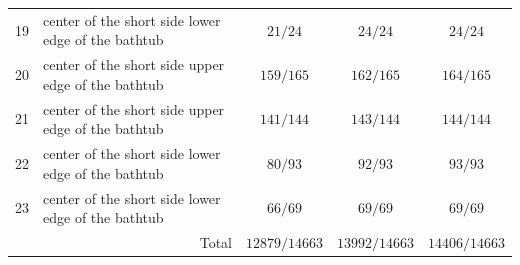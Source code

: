 \begin{table}[h]
\begin{tabular}{cl ccc}
19 & center of the short side lower edge of the bathtub & $21/24$ & $24/24$ & $24/24$ \\
20 & center of the short side upper edge of the bathtub & $159/165$ & $162/165$ & $164/165$ \\
21 & center of the short side upper edge of the bathtub & $141/144$ & $143/144$ & $144/144$ \\
22 & center of the short side lower edge of the bathtub & $80/93$ & $92/93$ & $93/93$ \\
23 & center of the short side lower edge of the bathtub & $66/69$ & $69/69$ & $69/69$ \\
\midrule
\multicolumn{2}{r}{Total} & $12879/14663$ & $13992/14663$ & $14406/14663$ \\
\bottomrule
\end{tabular}
\end{table}

